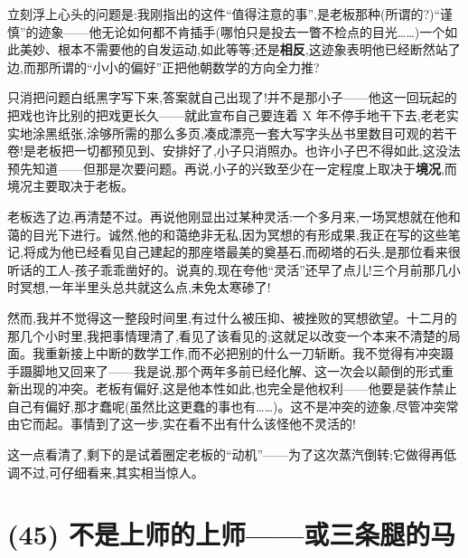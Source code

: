 立刻浮上心头的问题是:我刚指出的这件“值得注意的事”,是老板那种(所谓的?)“谨慎”的迹象——他无论如何都不肯插手(哪怕只是投去一瞥不检点的目光……)一个如此美妙、根本不需要他的自发运动,如此等等;还是\textbf{相反},这迹象表明他已经断然站了边,而那所谓的“小小的偏好”正把他朝数学的方向全力推?

只消把问题白纸黑字写下来,答案就自己出现了!并不是那小子——他这一回玩起的把戏也许比别的把戏更长久——就此宣布自己要连着 X 年不停手地干下去,老老实实地涂黑纸张,涂够所需的那么多页,凑成漂亮一套大写字头丛书里数目可观的若干卷!是老板把一切都预见到、安排好了,小子只消照办。也许小子巴不得如此,这没法预先知道——但那是次要问题。再说,小子的兴致至少在一定程度上取决于\textbf{境况},而境况主要取决于老板。

老板选了边,再清楚不过。再说他刚显出过某种灵活:一个多月来,一场冥想就在他和蔼的目光下进行。诚然,他的和蔼绝非无私,因为冥想的有形成果,我正在写的这些笔记,将成为他已经看见自己建起的那座塔最美的奠基石,而砌塔的石头,是那位看来很听话的工人-孩子乖乖凿好的。说真的,现在夸他“灵活”还早了点儿!三个月前那几小时冥想,一年半里头总共就这么点,未免太寒碜了!

 \noindent\pmark 然而,我并不觉得这一整段时间里,有过什么被压抑、被挫败的冥想欲望。十二月的那几个小时里,我把事情理清了,看见了该看见的;这就足以改变一个本来不清楚的局面。我重新接上中断的数学工作,而不必把别的什么一刀斩断。我不觉得有冲突蹑手蹑脚地又回来了——我是说,那个两年多前已经化解、这一次会以颠倒的形式重新出现的冲突。老板有偏好,这是他本性如此,也完全是他权利——他要是装作禁止自己有偏好,那才蠢呢(虽然比这更蠢的事也有……)。这不是冲突的迹象,尽管冲突常由它而起。事情到了这一步,实在看不出有什么该怪他不灵活的!

这一点看清了,剩下的是试着圈定老板的“动机”——为了这次蒸汽倒转;它做得再低调不过,可仔细看来,其实相当惊人。

\section{(45) 不是上师的上师——或三条腿的马}


